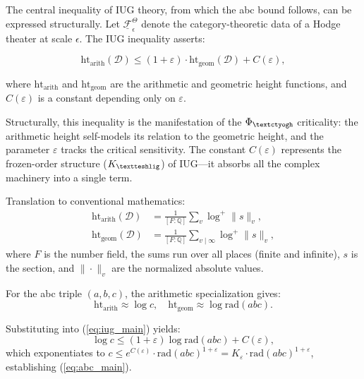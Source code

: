 \documentclass[12pt]{article}
\let\origDoublePipe\|
\let\|\origDoublePipe
\newcommand{\ctyogh}{\text{\textctyogh}}
\newcommand{\teshlig}{\text{\textteshlig}}
\begin{document}
The central inequality of IUG theory, from which the abc bound follows, can be expressed structurally. Let $\underline{\mathcal{F}}_{\epsilon}^\Theta$ denote the category-theoretic data of a Hodge theater at scale $\epsilon$. The IUG inequality asserts:

\begin{equation}
\text{ht}_{\text{arith}}(\mathcal{D}) \leq (1 + \varepsilon) \cdot \text{ht}_{\text{geom}}(\mathcal{D}) + C(\varepsilon),
\label{eq:iug_main}
\end{equation}

where $\text{ht}_{\text{arith}}$ and $\text{ht}_{\text{geom}}$ are the arithmetic and geometric height functions, and $C(\varepsilon)$ is a constant depending only on $\varepsilon$.

Structurally, this inequality is the manifestation of the $\Phi_{\ctyogh}$ criticality: the arithmetic height self-models its relation to the geometric height, and the parameter $\varepsilon$ tracks the critical sensitivity. The constant $C(\varepsilon)$ represents the frozen-order structure ($K_{\teshlig}$) of IUG---it absorbs all the complex machinery into a single term.

Translation to conventional mathematics:
\begin{align}
\text{ht}_{\text{arith}}(\mathcal{D}) &= \frac{1}{[F:\mathbb{Q}]} \sum_{v} \log^+ \| s \|_v, \label{eq:arith_height} \\
\text{ht}_{\text{geom}}(\mathcal{D}) &= \frac{1}{[F:\mathbb{Q}]} \sum_{v \mid \infty} \log^+ \| s \|_v, \label{eq:geom_height}
\end{align}
where $F$ is the number field, the sums run over all places (finite and infinite), $s$ is the section, and $\| \cdot \|_v$ are the normalized absolute values.

For the abc triple $(a,b,c)$, the arithmetic specialization gives:
\begin{equation}
\text{ht}_{\text{arith}} \approx \log c, \quad \text{ht}_{\text{geom}} \approx \log \text{rad}(abc).
\end{equation}

Substituting into (\ref{eq:iug_main}) yields:
\begin{equation}
\log c \leq (1+\varepsilon) \log \text{rad}(abc) + C(\varepsilon),
\end{equation}
which exponentiates to $c \leq e^{C(\varepsilon)} \cdot \text{rad}(abc)^{1+\varepsilon} = K_\varepsilon \cdot \text{rad}(abc)^{1+\varepsilon}$, establishing (\ref{eq:abc_main}).
\end{document}
